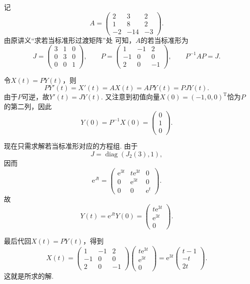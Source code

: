 \documentclass[12pt,fontset=fandol]{ctexart}
\begin{document}
\begin{solve}
记
    \[
        A=\begin{pmatrix}
            2 & 3 & 2 \\ 1 & 8 & 2 \\ -2 & -14 & -3
        \end{pmatrix}.
    \]
    由原讲义“求若当标准形过渡矩阵”处 可知，$A$的若当标准形为
    \[
        J=\begin{pmatrix}
            3 & 1 & 0 \\ 0 & 3 & 0 \\ 0 & 0 & 1
        \end{pmatrix},
        \qquad
        P=\begin{pmatrix}
            1 & -1 & 2 \\ -1 & 0 & 0 \\ 2 & 0 & -1
        \end{pmatrix},
        \qquad
        P^{-1}AP=J.
    \]

    令$X(t)=PY(t)$，则
    \[
        PY'(t)=X'(t)=AX(t)=APY(t)=PJY(t).
    \]
    由于$P$可逆，故$Y'(t)=JY(t)$. 又注意到初值向量$X(0)=(-1,0,0)^\mathrm{T}$恰为$P$的第二列，因此
    \[
        Y(0)=P^{-1}X(0)=\begin{pmatrix}
            0 \\ 1 \\ 0
        \end{pmatrix}.
    \]

    现在只需求解若当标准形对应的方程组. 由于
    \[
        J=\operatorname{diag}(J_2(3),1),
    \]
    因而
    \[
        \mathrm{e}^{Jt}=\begin{pmatrix}
            \mathrm{e}^{3t} & t\mathrm{e}^{3t} & 0 \\
            0 & \mathrm{e}^{3t} & 0 \\
            0 & 0 & \mathrm{e}^{t}
        \end{pmatrix}.
    \]
    故
    \[
        Y(t)=\mathrm{e}^{Jt}Y(0)=\begin{pmatrix}
            t\mathrm{e}^{3t} \\ \mathrm{e}^{3t} \\ 0
        \end{pmatrix}.
    \]

    最后代回$X(t)=PY(t)$，得到
    \[
        X(t)=\begin{pmatrix}
            1 & -1 & 2 \\ -1 & 0 & 0 \\ 2 & 0 & -1
        \end{pmatrix}\begin{pmatrix}
            t\mathrm{e}^{3t} \\ \mathrm{e}^{3t} \\ 0
        \end{pmatrix}
        =\mathrm{e}^{3t}\begin{pmatrix}
            t-1 \\ -t \\ 2t
        \end{pmatrix}.
    \]
    这就是所求的解.
\end{solve}
\end{document}
